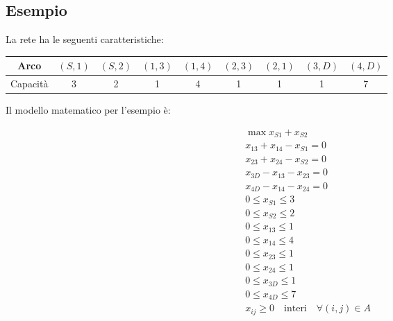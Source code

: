 \subsection{Esempio}
La rete ha le seguenti caratteristiche:

\begin{table}[!ht]
	\begin{adjustbox}{width=0.4\columnwidth,center}
		\begin{tabular}{|c|c|c|c|c|c|c|c|c|}
			\hline
			Arco     & $(S, 1)$ & $(S, 2)$ & $(1, 3)$ & $(1, 4)$ & $(2, 3)$ & $(2, 1)$ & $(3, D)$ & $(4, D)$ \\
			\hline
			Capacità & 3        & 2        & 1        & 4        & 1        & 1        & 1        & 7        \\
			\hline
		\end{tabular}
	\end{adjustbox}
\end{table}


Il modello matematico per l'esempio è:

\begin{align}
	 & \max x_{S1} + x_{S2}                                         \\
	 & x_{13} + x_{14} - x_{S1} = 0                                 \\
	 & x_{23} + x_{24} - x_{S2} = 0                                 \\
	 & x_{3D} - x_{13} - x_{23} = 0                                 \\
	 & x_{4D} - x_{14} - x_{24} = 0                                 \\
	 & 0 \leq x_{S1} \leq 3                                         \\
	 & 0 \leq x_{S2} \leq 2                                         \\
	 & 0 \leq x_{13} \leq 1                                         \\
	 & 0 \leq x_{14} \leq 4                                         \\
	 & 0 \leq x_{23} \leq 1                                         \\
	 & 0 \leq x_{24} \leq 1                                         \\
	 & 0 \leq x_{3D} \leq 1                                         \\
	 & 0 \leq x_{4D} \leq 7                                         \\
	 & x_{ij} \geq 0 \quad \text{interi} \quad \forall (i, j) \in A
\end{align}

